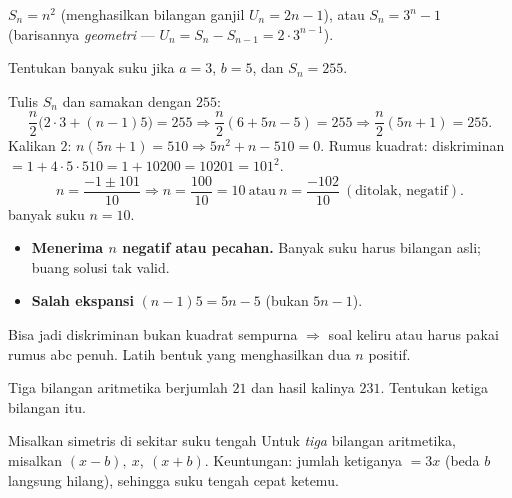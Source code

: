 \begin{variasi}
$S_n=n^2$ (menghasilkan bilangan ganjil $U_n=2n-1$), atau $S_n=3^n-1$
(barisannya \emph{geometri} --- $U_n=S_n-S_{n-1}=2\cdot3^{n-1}$).
\end{variasi}

\begin{soalbox}{}
Tentukan banyak suku jika $a=3$, $b=5$, dan $S_n=255$.
\end{soalbox}

\jawab
{} Tulis $S_n$ dan samakan dengan $255$:
\[
\frac n2\big(2\cdot3+(n-1)5\big)=255 \Rightarrow \frac n2(6+5n-5)=255 \Rightarrow \frac n2(5n+1)=255.
\]
 Kalikan $2$: $n(5n+1)=510 \Rightarrow 5n^2+n-510=0$.
 Rumus kuadrat: diskriminan $=1+4\cdot5\cdot510=1+10200=10201=101^2$.
\[
n=\frac{-1\pm101}{10}\Rightarrow n=\frac{100}{10}=10 \ \text{atau}\ n=\frac{-102}{10}\ (\text{ditolak, negatif}).
\]
\jadi banyak suku $n=10$.

\begin{jebakan}
\begin{itemize}[leftmargin=*,topsep=2pt]
  \item \textbf{Menerima $n$ negatif atau pecahan.} Banyak suku harus bilangan
  asli; buang solusi tak valid.
  \item \textbf{Salah ekspansi} $(n-1)5=5n-5$ (bukan $5n-1$).
\end{itemize}
\end{jebakan}

\begin{variasi}
Bisa jadi diskriminan bukan kuadrat sempurna $\Rightarrow$ soal keliru atau harus
pakai rumus abc penuh. Latih bentuk yang menghasilkan dua $n$ positif.
\end{variasi}

\begin{soalbox}{}
Tiga bilangan aritmetika berjumlah $21$ dan hasil kalinya $231$. Tentukan ketiga
bilangan itu.
\end{soalbox}

\begin{ingat}{Misalkan simetris di sekitar suku tengah}
Untuk \emph{tiga} bilangan aritmetika, misalkan $(x-b),\ x,\ (x+b)$. Keuntungan:
jumlah ketiganya $=3x$ (beda $b$ langsung hilang), sehingga suku tengah cepat
ketemu.
\end{ingat}

